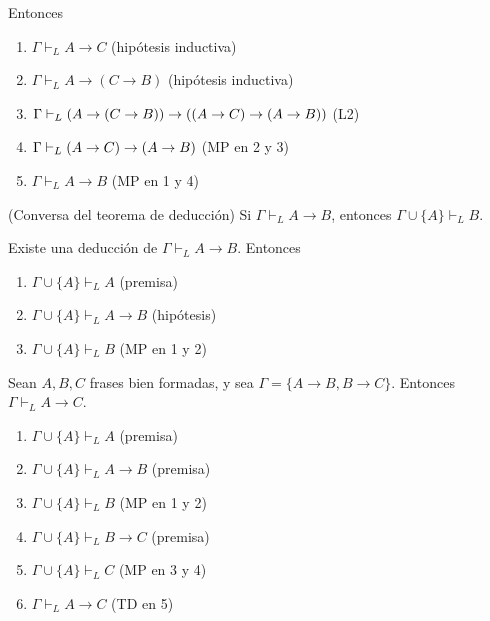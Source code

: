 \begin{prove}
\begin{itemize}
    Entonces
    \begin{enumerate}
        \item $\Gamma \vdash_L A \to C$         \hfill (hipótesis inductiva)
        \item $\Gamma \vdash_L A \to (C \to B)$ \hfill (hipótesis inductiva)
        \item $\Gamma \vdash_L (A \to (C \to B)) \to ((A \to C) \to (A \to B))$        \hfill (L2)
        \item $\Gamma \vdash_L (A \to C) \to (A \to B)$        \hfill (MP en 2 y 3)
        \item $\Gamma \vdash_L A \to B$         \hfill (MP en 1 y 4)
    \end{enumerate}
\end{itemize}
\end{prove}

\begin{proposition}
(Conversa del teorema de deducción) Si $\Gamma \vdash_L A \to B$, entonces $\Gamma \cup \{ A \} \vdash_L B$.
\end{proposition}

\begin{prove}
Existe una deducción de $\Gamma \vdash_L A \to B$. Entonces
\begin{enumerate}
    \item $\Gamma \cup \{ A \} \vdash_L A$       \hfill (premisa)
    \item $\Gamma \cup \{ A \} \vdash_L A \to B$ \hfill (hipótesis)
    \item $\Gamma \cup \{ A \} \vdash_L B$       \hfill (MP en 1 y 2)
\end{enumerate}
\end{prove}

\begin{corollary}
Sean $A,B,C$ frases bien formadas, y sea $\Gamma = \{ A \to B, B \to C \}$. Entonces $\Gamma \vdash_L A \to C$.
\end{corollary}

\begin{prove}
\leavevmode
\begin{enumerate}
    \item $\Gamma \cup \{ A \} \vdash_L A$       \hfill (premisa)
    \item $\Gamma \cup \{ A \} \vdash_L A \to B$ \hfill (premisa)
    \item $\Gamma \cup \{ A \} \vdash_L B$       \hfill (MP en 1 y 2)
    \item $\Gamma \cup \{ A \} \vdash_L B \to C$ \hfill (premisa)
    \item $\Gamma \cup \{ A \} \vdash_L C$       \hfill (MP en 3 y 4)
    \item $\Gamma \vdash_L A \to C$              \hfill (TD en 5)
\end{enumerate}
\end{prove}

